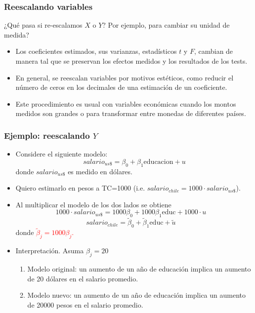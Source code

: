 \documentclass{beamer}
\begin{document}
\begin{frame}
\frametitle{Reescalando variables}
¿Qué pasa si re-escalamos \(X\) o \(Y\)? Por ejemplo, para cambiar su unidad de medida?
\begin{itemize}

    \item Los coeficientes estimados, sus varianzas, estadísticos \(t\) y \(F\), cambian de manera tal que se preservan los efectos medidos y los resultados de los tests.
    \item En general, se reescalan variables por motivos estéticos, como reducir el número de ceros en los decimales de una estimación de un coeficiente.
    \item Este procedimiento es usual con variables económicas cuando los montos medidos son grandes o para transformar entre monedas de diferentes países.
\end{itemize}

\end{frame}
\begin{frame}
\frametitle{Ejemplo: reescalando \(Y\)}

\begin{itemize}
    \item Considere el siguiente modelo:
    \[
    {salario_{us\$}} = \beta_0 + \beta_1\text{educacion} + u
    \]
    donde ${salario_{us\$}}$ es medido en dólares.
    \item Quiero estimarlo en pesos a TC=1000 (i.e. \({salario_{chile}} = 1000 \cdot {salario_{us\$}}\)).
    \item Al multiplicar el modelo de los dos lados se obtiene
    \[
    1000 \cdot {salario_{us\$}} = 1000 \beta_0 + 1000 \beta_1 \text{educ} + 1000 \cdot u \quad
    \]
    \[
    {salario_{chile}} = \tilde{\beta}_0 + \tilde{\beta}_1 \text{educ} + \tilde{u} \quad
    \]
    donde \textcolor{red}{\(\tilde{\beta}_j = 1000 \beta_j\).}
    \item Interpretación. Asuma \(\beta_j = 20\)
    \begin{enumerate}
        \item Modelo original: un aumento de un año de educación implica un aumento de 20 dólares en el salario promedio.
        \item Modelo nuevo: un aumento de un año de educación implica un aumento de 20000 pesos en el salario promedio.
    \end{enumerate}
\end{itemize}
\text{}
\end{frame}
\end{document}
